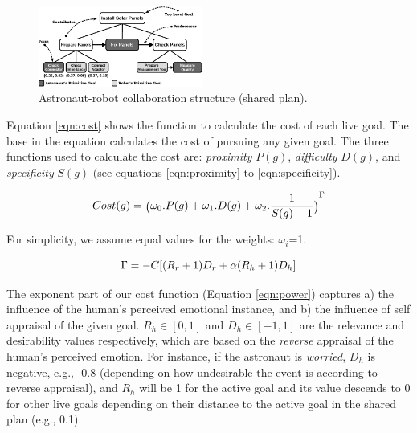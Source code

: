 \documentclass[conference]{IEEEtran}
\begin{document}
\begin{figure}[tbh]
  \centering
  \includegraphics[width=0.48\textwidth]{figure/collaborationStructure-croped.pdf}
  \vspace*{-3mm}
  \caption{{\fontsize{9}{9}\selectfont Astronaut-robot collaboration structure
  (shared plan).}}
  \label{fig:taskModel}
  \vspace*{-6mm}
\end{figure}

Equation \ref{eqn:cost} shows the function to calculate the cost of each
live goal. The base in the equation calculates the cost of pursuing any given
goal. The three functions used to calculate the cost are:
\textit{proximity} $P(g)$, \textit{difficulty} $D(g)$, and \textit{specificity}
$S(g)$ (see equations \ref{eqn:proximity} to \ref{eqn:specificity}).

\vspace*{-4mm}
\begin{equation}
{\fontsize{6}{9}\selectfont Cost(g) =
\big(\omega_0.P(g)+\omega_1.D(g)+\omega_2.\frac{1}{S(g)+1}\big)}^{\Gamma}
\label{eqn:cost}
\vspace*{-2mm}
\end{equation}

\noindent For simplicity, we assume equal values for the weights: $\omega_i$=1.

\vspace*{-4mm}
\begin{equation}
\Gamma=-C[(R_r+1)D_r + \alpha(R_h+1)D_h]
\label{eqn:power}
\vspace*{-2mm}
\end{equation}

The exponent part of our cost function (Equation \ref{eqn:power}) captures a)
the influence of the human's perceived emotional instance, and b) the influence
of self appraisal of the given goal. $R_h\in[0,1]$ and $D_h\in[-1,1]$ are the
relevance and desirability values respectively, which are based on the
\textit{reverse} appraisal of the human's perceived emotion. For instance, if
the astronaut is \textit{worried}, $D_h$ is negative, e.g., -0.8 (depending on
how undesirable the event is according to reverse appraisal), and $R_h$ will be
1 for the active goal and its value descends to 0 for other live goals depending
on their distance to the active goal in the shared plan (e.g., 0.1).
\end{document}

